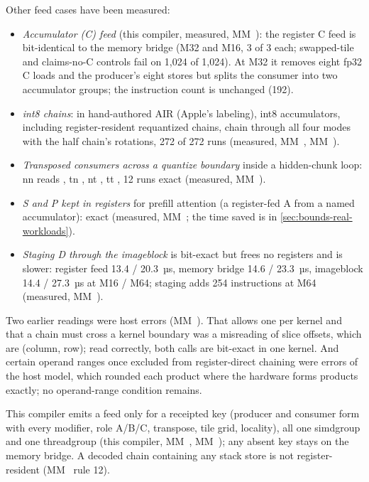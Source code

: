 Other feed cases have been measured:

\begin{itemize}
\item \emph{Accumulator (C) feed} (this compiler, measured, MM~): the register C feed is bit-identical to the memory
  bridge (M32 and M16, 3 of 3 each; swapped-tile and claims-no-C controls fail on 1,024 of 1,024). At M32 it removes
  eight fp32 C loads and the producer's eight stores but splits the consumer into two accumulator groups; the
  instruction count is unchanged (192).
\item \emph{int8 chains}: in hand-authored AIR (Apple's labeling), int8 accumulators, including register-resident requantized
  chains, chain through all four modes with the half chain's rotations, 272 of 272 runs (measured, MM~, MM~).
\item \emph{Transposed consumers across a quantize boundary} inside a hidden-chunk loop: nn reads , tn , nt
  , tt , 12 runs exact (measured, MM~).
\item \emph{S and P kept in registers} for prefill attention (a register-fed A from a named accumulator): exact (measured,
  MM~; the time saved is in \cref{sec:bounds-real-workloads}).
\item \emph{Staging D through the imageblock} is bit-exact but frees no registers and is slower: register feed 13.4 / 20.3~µs,
  memory bridge 14.6 / 23.3~µs, imageblock 14.4 / 27.3~µs at M16 / M64; staging adds 254 instructions at M64
  (measured, MM~).
\end{itemize}

Two earlier readings were host errors (MM~). That  allows one  per kernel and that a
chain must cross a kernel boundary was a misreading of slice offsets, which are (column, row); read correctly, both
calls are bit-exact in one kernel. And certain operand ranges once excluded from register-direct chaining were errors
of the host model, which rounded each product where the hardware forms products exactly; no operand-range condition
remains.

This compiler emits a feed only for a receipted key
(producer and consumer form with every modifier, role A/B/C, transpose, tile grid, locality), all one simdgroup and
one threadgroup (this compiler, MM~, MM~); any absent key stays on the memory bridge. A decoded chain containing any stack store is not
register-resident (MM~ rule 12).

